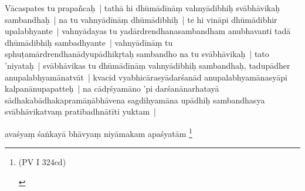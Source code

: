\documentclass[article,a4paper]{memoir}
\begin{document}
	  \pstart Vā\-caspates tu prapañcaḥ | tathā\- hi dhū\-mā\-dī\-nā\-ṃ vahnyā\-dibhiḥ svā\-bhā\-vikaḥ sambandhaḥ | na tu vahnyā\-dī\-nā\-ṃ dhū\-mā\-dibhiḥ | te hi vinā\-pi dhū\-mā\-dibhir upalabhyante | vahnyā\-dayas tu yadā\-rdrendhanasambandham anubhavanti tadā\- dhū\-mā\-dibhiḥ sambadhyante | vahnyā\-dī\-nā\-ṃ tu sphuṭamā\-rdrendhanā\-dyupā\-dhikṛtaḥ sambandho na tu svā\-bhā\-vikaḥ | tato 'niyataḥ | svā\-bhā\-vikas tu dhū\-mā\-dī\-nā\-ṃ vahnyā\-dibhiḥ sambandhaḥ, tadupā\-dher anupalabhyamā\-natvā\-t | kvacid vyabhicā\-rasyā\-darśanā\-d anupalabhyamā\-nasyā\-pi kalpanā\-nupapatteḥ | na cā\-dṛśyamā\-no 'pi darśanā\-narhatayā\- sā\-dhakabā\-dhakapramā\-ṇā\-bhā\-vena sagdihyamā\-na upā\-dhiḥ sambandhasya svā\-bhā\-vikatvaṃ pratibadhnā\-tī\-ti yuktam |
	\pend
      

	  \pstart avaśyaṃ śaṅkayā\- bhā\-vyaṃ niyā\-makam apaśyatā\-m \footnote{\begin{english}(PV I 324cd)\end{english}}
	\pend
      
\end{document}
